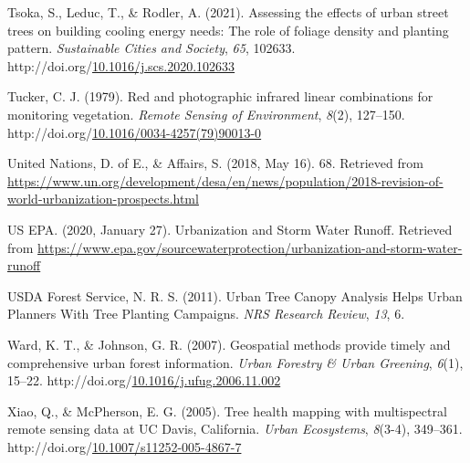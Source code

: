 \documentclass[12pt,twoside]{reedthesis}
\newlength{\cslhangindent}
\newenvironment{CSLReferences}[2] %
 {%
  \setlength{\parindent}{0pt}
  \ifodd #1 \everypar{\setlength{\hangindent}{\cslhangindent}}\ignorespaces\fi
  \ifnum #2 > 0
  \setlength{\parskip}{#2\baselineskip}
  \fi
 }%
 {}
\begin{document}
\begin{CSLReferences}{1}{0}
\leavevmode{}%
Tsoka, S., Leduc, T., \& Rodler, A. (2021). Assessing the effects of urban street trees on building cooling energy needs: The role of foliage density and planting pattern. \emph{Sustainable Cities and Society}, \emph{65}, 102633. http://doi.org/\href{https://doi.org/10.1016/j.scs.2020.102633}{10.1016/j.scs.2020.102633}

\leavevmode{}%
Tucker, C. J. (1979). Red and photographic infrared linear combinations for monitoring vegetation. \emph{Remote Sensing of Environment}, \emph{8}(2), 127--150. http://doi.org/\href{https://doi.org/10.1016/0034-4257(79)90013-0}{10.1016/0034-4257(79)90013-0}

\leavevmode{}%
United Nations, D. of E., \& Affairs, S. (2018, May 16). 68. Retrieved from \url{https://www.un.org/development/desa/en/news/population/2018-revision-of-world-urbanization-prospects.html}

\leavevmode{}%
US EPA. (2020, January 27). Urbanization and Storm Water Runoff. Retrieved from \url{https://www.epa.gov/sourcewaterprotection/urbanization-and-storm-water-runoff}

\leavevmode{}%
USDA Forest Service, N. R. S. (2011). Urban Tree Canopy Analysis Helps Urban Planners With Tree Planting Campaigns. \emph{NRS Research Review}, \emph{13}, 6.

\leavevmode{}%
Ward, K. T., \& Johnson, G. R. (2007). Geospatial methods provide timely and comprehensive urban forest information. \emph{Urban Forestry \& Urban Greening}, \emph{6}(1), 15--22. http://doi.org/\href{https://doi.org/10.1016/j.ufug.2006.11.002}{10.1016/j.ufug.2006.11.002}

\leavevmode{}%
Xiao, Q., \& McPherson, E. G. (2005). Tree health mapping with multispectral remote sensing data at UC Davis, California. \emph{Urban Ecosystems}, \emph{8}(3-4), 349--361. http://doi.org/\href{https://doi.org/10.1007/s11252-005-4867-7}{10.1007/s11252-005-4867-7}

\end{CSLReferences}

\end{document}
